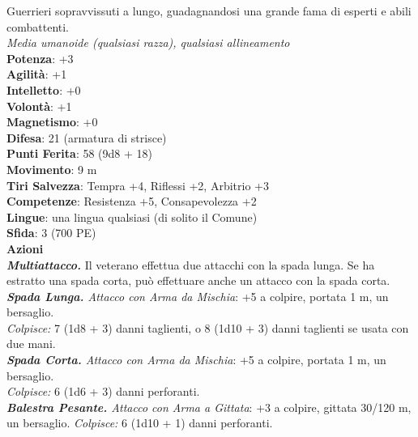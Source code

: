 \begin{multicols}{2}
Guerrieri sopravvissuti a lungo, guadagnandosi una grande fama di esperti e abili combattenti.\\
\emph{Media umanoide (qualsiasi razza), qualsiasi allineamento}\\
\textbf{Potenza}: +3\\
\textbf{Agilità}: +1\\
\textbf{Intelletto}: +0\\
\textbf{Volontà}: +1\\
\textbf{Magnetismo}: +0\\
\textbf{Difesa}: 21 (armatura di strisce)\\
\textbf{Punti Ferita}: 58 (9d8 + 18)\\
\textbf{Movimento}: 9 m\\
\textbf{Tiri Salvezza}: Tempra +4, Riflessi +2, Arbitrio +3 \\
\textbf{Competenze}: Resistenza +5, Consapevolezza +2\\
\textbf{Lingue}: una lingua qualsiasi (di solito il Comune)\\
\textbf{Sfida}: 3 (700 PE)\smallskip\\
\smallskip\textbf{Azioni}\\
\emph{\textbf{Multiattacco.}} Il veterano effettua due attacchi con la spada lunga. Se ha estratto una spada corta, può effettuare anche un attacco con la spada corta.
\emph{\textbf{Spada Lunga.} Attacco con Arma da Mischia}: +5 a colpire, portata 1 m, un bersaglio.\\
\emph{Colpisce:} 7 (1d8 + 3) danni taglienti, o 8 (1d10 + 3) danni taglienti se usata con due mani.\\
\emph{\textbf{Spada Corta.} Attacco con Arma da Mischia}: +5 a colpire, portata 1 m, un bersaglio.\\
\emph{Colpisce:} 6 (1d6 + 3) danni perforanti.\\
\emph{\textbf{Balestra Pesante.} Attacco con Arma a Gittata}: +3 a colpire, gittata 30/120 m, un bersaglio. \emph{Colpisce:} 6 (1d10 + 1) danni perforanti.\\


\end{multicols}
